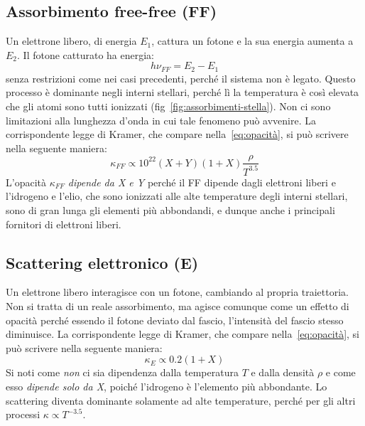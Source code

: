 \subsection{Assorbimento free-free (FF)}\label{sec:free-free}
Un elettrone libero, di energia $E_1$, cattura un fotone e la sua energia aumenta a $E_2$. Il fotone catturato ha energia:
\begin{equation}
    h \nu_{FF} = E_2 - E_1
\end{equation}
senza restrizioni come nei casi precedenti, perché il sistema non è legato. Questo processo è dominante negli interni stellari, perché lì la temperatura è così elevata che gli atomi sono tutti ionizzati (fig~\ref{fig:assorbimenti-stella}). Non ci sono limitazioni alla lunghezza d'onda in cui tale fenomeno può avvenire. La corrispondente legge di Kramer, che compare nella~\eqref{eq:opacità}, si può scrivere nella seguente maniera:
\begin{equation}
   \kappa_{FF} \propto 10^{22} (X+Y) (1+X) \dfrac{\rho}{T^{3.5}}
\end{equation}
L'opacità $\kappa_{FF}$ \emph{dipende da X e Y} perché il FF dipende dagli elettroni liberi e l'idrogeno e l'elio, che sono ionizzati alle alte temperature degli interni stellari, sono di gran lunga gli elementi più abbondandi, e dunque anche i principali fornitori di elettroni liberi.

\subsection{Scattering elettronico (E)}\label{sec:electron-scattering}
Un elettrone libero interagisce con un fotone, cambiando al propria traiettoria. Non si tratta di un reale assorbimento, ma agisce comunque come un effetto di opacità perché essendo il fotone deviato dal fascio, l'intensità del fascio stesso diminuisce. La corrispondente legge di Kramer, che compare nella~\eqref{eq:opacità}, si può scrivere nella seguente maniera:
\begin{equation}
    \kappa_E \propto 0.2(1+X)
\end{equation}
Si noti come \emph{non} ci sia dipendenza dalla temperatura $T$ e dalla densità $\rho$ e come esso \emph{dipende solo da X}, poiché l'idrogeno è l'elemento più abbondante. Lo scattering diventa dominante solamente ad alte temperature, perché per gli altri processi $\kappa \propto T^{-3.5}$.

